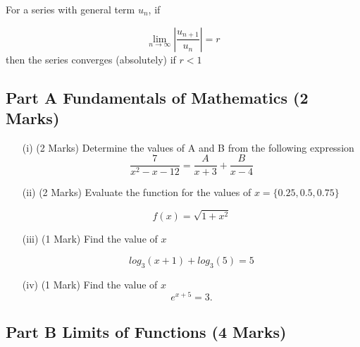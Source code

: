 \documentclass[11pt]{article} %
\begin{document}
	For a series with general term $u_n$, if
	
	\[ \lim_{n \to \infty } \left| \frac{u_{n+1}}{u_n} \right| = r\]
	then the series converges (absolutely) if $r<1$


	
	



\subsection*{Part A Fundamentals of Mathematics (2 Marks) } %

\begin{itemize}
	
	\item[(i)] (2 Marks) Determine the values of A and B from the following expression
	\[  \frac{7}{x^2-x-12} = \frac{A}{x+3} + \frac{B}{x-4}\]
	\vspace{1.5cm}
	
	\item[(ii)] (2 Marks) Evaluate the function for the values of  $ x = \{0.25, 0.5 , 0.75 \}$
	
	\[  f(x) = \sqrt{1+x^2} \]
	

	\vspace{1.8cm}
	\newpage
	
	\item [(iii)](1 Mark) Find the value of $x$
	
	\[log_3(x + 1) + log_3(5) = 5\]
	
		
		\vspace{1.8cm}
		
	\item[(iv)] (1 Mark) Find the value of $x$
		\[e^{x+5} = 3. \]
	
\end{itemize}

\newpage
\subsection*{Part B Limits of Functions (4 Marks)}
\end{document}
